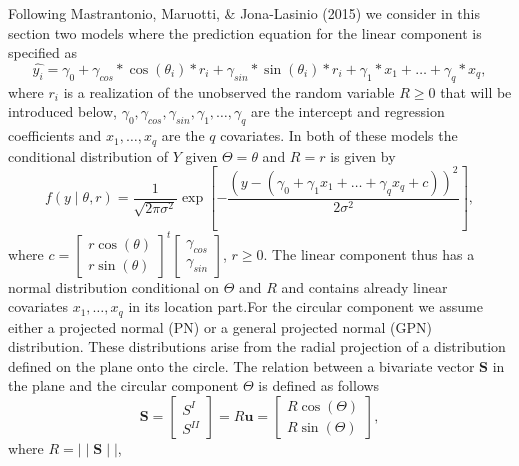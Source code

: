 \documentclass[12pt,]{article}
\begin{document}
Following Mastrantonio, Maruotti, \& Jona-Lasinio (2015) we consider in
this section two models where the prediction equation for the linear
component is specified as \begin{equation}\label{linpredCLPNCLGPN}
\hat{y_i} = \gamma_0 + \gamma_{cos}*\cos(\theta_i)*r_i + \gamma_{sin}*\sin(\theta_i)*r_i + \gamma_1*x_1 + \dots + \gamma_q*x_q,
\end{equation} \noindent where \(r_i\) is a realization of the
unobserved the random variable \(R\geq0\) that will be introduced below,
\(\gamma_0, \gamma_{cos}, \gamma_{sin}, \gamma_1, \dots, \gamma_q\) are
the intercept and regression coefficients and \(x_1, \dots, x_q\) are
the \(q\) covariates. In both of these models the conditional
distribution of \(Y\) given \(\Theta=\theta\) and \(R = r\) is given by
\begin{equation}\label{ycondtheta}
f(y \mid \theta, r) = \frac{1}{\sqrt{2\pi\sigma^2}}\exp\left[-\frac{(y - (\gamma_0 + \gamma_1x_1 + \dots + \gamma_qx_q+c))^{2}}{2\sigma^2}\right],\nonumber
\end{equation} \noindent where
\(c = \begin{bmatrix} r \cos(\theta) \\ r\sin(\theta) \end{bmatrix}^t \begin{bmatrix} \gamma_{cos} \\ \gamma_{sin} \end{bmatrix}\),
\(r \geq 0\). The linear component thus has a normal distribution
conditional on \(\Theta\) and \(R\) and contains already linear
covariates \(x_1, \dots, x_q\) in its location part.\newline \indent For
the circular component we assume either a projected normal (PN) or a
general projected normal (GPN) distribution. These distributions arise
from the radial projection of a distribution defined on the plane onto
the circle. The relation between a bivariate vector \(\boldsymbol{S}\)
in the plane and the circular component \(\Theta\) is defined as follows
\begin{equation}\label{projection}
\boldsymbol{S} = \begin{bmatrix} S^{I} \\ S^{II} \end{bmatrix} = R\boldsymbol{u} = \begin{bmatrix} R \cos (\Theta) \\  R\sin (\Theta) \end{bmatrix},
\end{equation} \noindent where \(R = \mid\mid \boldsymbol{S} \mid\mid\),
\end{document}
